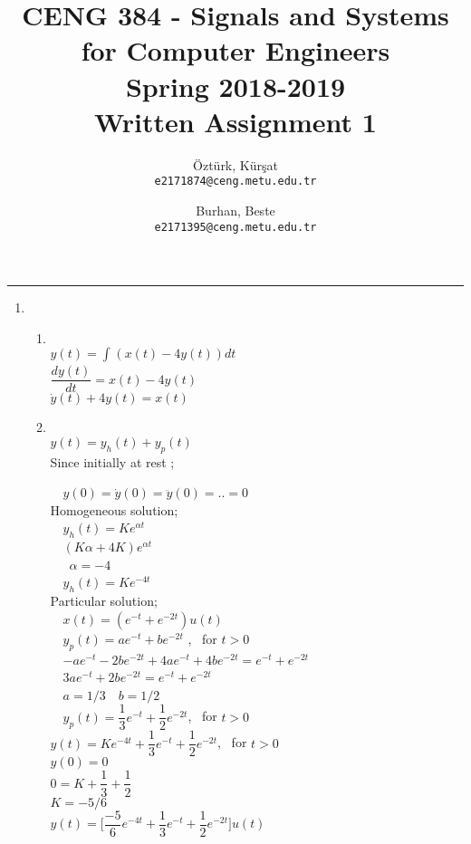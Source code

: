 \documentclass[10pt,a4paper, margin=1in]{article}
\author{
  Öztürk, Kürşat\\
  \texttt{e2171874@ceng.metu.edu.tr}
  \and
  Burhan, Beste\\
  \texttt{e2171395@ceng.metu.edu.tr}
}
\title{CENG 384 - Signals and Systems for Computer Engineers \\
Spring 2018-2019 \\
Written Assignment 1}
\begin{document}
\maketitle



\noindent\rule{19cm}{1.2pt}

\begin{enumerate}

\item 
    \begin{enumerate}
    \item %
    \ \\
    $y(t)= \int_{}^{} (x(t)-4y(t))dt$\\
    $\dfrac{dy(t)}{dt} = x(t)-4y(t)$\\
    $\dot{y}(t)+ 4y(t) = x(t)$
    \item %
    \ \\
    $y(t) = y_h(t)+y_p(t)$\\
    Since initially at rest ;
    
    \ \ $y(0)=\dot{y}(0)=\ddot{y}(0)=.. = 0$\\
    Homogeneous solution;\\
    \null \ \ $y_h(t) = Ke^{\alpha t}$\\
    \null \ \ $(K\alpha+4K) e^{\alpha t}$\\\
    \null  \ \ $\alpha = -4$\\
    \null \ \ $y_h(t) = Ke^{-4t}$\\
    Particular solution;\\
    \null \ \ $x(t) = (e^{-t}+e^{-2t})u(t)$\\
    \null \ \ $ y_p(t) = a e^{-t}+be^{-2t}$ , \ \quad for $t>0$\\
    \null \ \ $ -ae^{-t}-2b e^{-2t}+4ae^{-t}+4b e^{-2t}= e^{-t}+e^{-2t}$\\
    \null \ \ $ 3a e^{-t}+ 2b e^{-2t}= e^{-t}+e^{-2t}$\\
    \null \ \ $a=1/3 \quad b=1/2$\\
    \null \ \ $ y_p(t) = \dfrac{1}{3}e^{-t}+\dfrac{1}{2}e^{-2t}$, \ \quad for $t>0$\\
    
    $y(t)= Ke^{-4t}+\dfrac{1}{3}e^{-t}+\dfrac{1}{2}e^{-2t}$, \ \quad for $t>0$\\
    $y(0)=0$\\
    $0=K+\dfrac{1}{3}+\dfrac{1}{2}$\\
    $K=-5/6$\\
    $y(t)=\Big[ \dfrac{-5}{6}e^{-4t}+\dfrac{1}{3}e^{-t}+\dfrac{1}{2}e^{-2t}\Big]u(t)$


\end{enumerate}
\end{enumerate}
\end{document}
